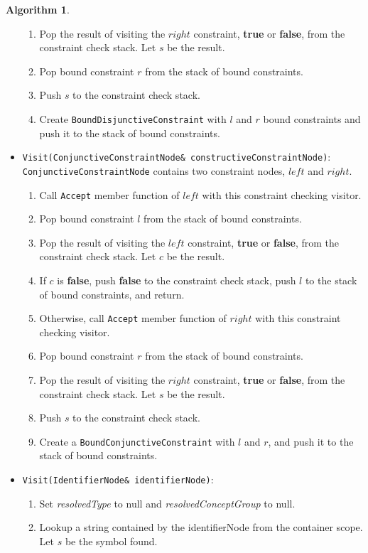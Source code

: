 \documentclass[a4paper,oneside,11pt]{book}
\theoremstyle{definition}
\newtheorem{algo}{Algorithm}[section]
\begin{document}
\begin{algo}
\begin{itemize}
\begin{enumerate}
\item
Pop the result of visiting the $right$ constraint, \textbf{true} or \textbf{false}, from the constraint check stack. Let $s$ be the result.
\item
Pop bound constraint $r$ from the stack of bound constraints.
\item
Push $s$ to the constraint check stack.
\item
Create \verb|BoundDisjunctiveConstraint| with $l$ and $r$ bound constraints and push it to the stack of bound constraints.
\end{enumerate}
\item
\verb|Visit(ConjunctiveConstraintNode& constructiveConstraintNode)|:\\
\verb|ConjunctiveConstraintNode| contains two constraint nodes, $left$ and $right$.
\begin{enumerate}
\item
Call \verb|Accept| member function of $left$ with this constraint checking visitor.
\item
Pop bound constraint $l$ from the stack of bound constraints.
\item
Pop the result of visiting the $left$ constraint, \textbf{true} or \textbf{false}, from the constraint check stack. Let $c$ be the result.
\item
If $c$ is \textbf{false}, push \textbf{false} to the constraint check stack, push $l$ to the stack of bound constraints, and return.
\item
Otherwise, call \verb|Accept| member function of $right$ with this constraint checking visitor.
\item
Pop bound constraint $r$ from the stack of bound constraints.
\item
Pop the result of visiting the $right$ constraint, \textbf{true} or \textbf{false}, from the constraint check stack. Let $s$ be the result.
\item
Push $s$ to the constraint check stack.
\item
Create a \verb|BoundConjunctiveConstraint| with $l$ and $r$, and push it to the stack of bound constraints.
\end{enumerate}
\item
\verb|Visit(IdentifierNode& identifierNode)|:\\
\begin{enumerate}
\item
Set \emph{resolvedType} to null and \emph{resolvedConceptGroup} to null.
\item
Lookup a string contained by the identifierNode from the container scope. Let $s$ be the symbol found.

\end{enumerate}
\end{itemize}
\end{algo}
\end{document}
